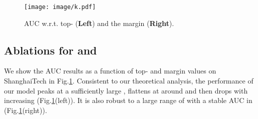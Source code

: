 \documentclass[10pt,twocolumn,letterpaper]{article}
\begin{document}
\begin{figure}[h!]
\begin{center}
\texttt{[image: image/k.pdf]}
\end{center}
 \caption{AUC w.r.t. top- (\textbf{Left}) and the margin  (\textbf{Right}).  
 }
\label{fig:k_fig}
\end{figure}

\subsection{Ablations for  and }
We show the AUC results as a function of top- and margin  values on ShanghaiTech in Fig.\ref{fig:k_fig}. Consistent to our theoretical analysis, the performance of our model peaks at a sufficiently large , flattens at around  and then drops with increasing   (Fig.\ref{fig:k_fig}(left)). It is also robust to a large range of  with a stable AUC in  (Fig.\ref{fig:k_fig}(right)). 
\end{document}
